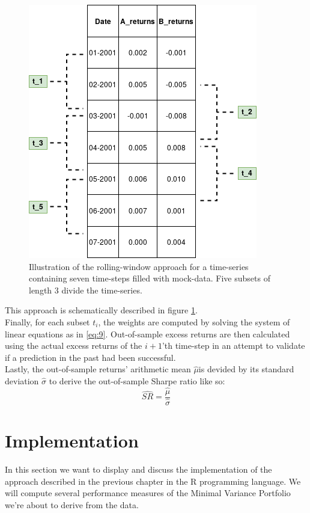 \begin{figure}[h]
  \begin{center}
    \includegraphics[width=.50\textwidth]{Bilder/rolling_window.png}
    \caption{Illustration of the rolling-window approach for a time-series containing seven time-steps filled with mock-data. Five subsets of length 3 divide the time-series.}
    \label{fig:rolling_window}
  \end{center}
\end{figure}
This approach is schematically described in figure \ref{fig:rolling_window}.\\

Finally, for each subset $t_i$, the weights are computed by solving the system of linear equations as in \ref{eq:9}. Out-of-sample excess returns are then calculated using the actual excess returns of the $i+1$'th time-step in an attempt to validate if a prediction in the past had been successful.\\

Lastly, the out-of-sample returns' arithmetic mean $\hat{\mu}$is devided by its standard deviation $\hat{\sigma}$ to derive the out-of-sample Sharpe ratio like so:
\begin{equation}\label{eq:out-of-sample-sharpe}
\hat{SR} = \frac{\hat{\mu}}{\hat{\sigma}}
\end{equation}

\newpage

\section{Implementation}
In this section we want to display and discuss the implementation of the approach described in the previous chapter in the R programming language. We will compute several performance measures of the Minimal Variance Portfolio we're about to derive from the data.


